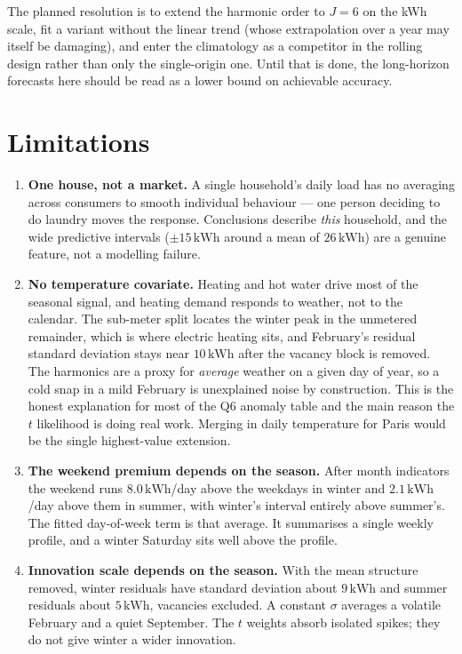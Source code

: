 \documentclass[11pt]{article}
\newcommand{\kwh}{\,\mathrm{kWh}}
\begin{document}
The planned resolution is to extend the harmonic order to $J = 6$ on the kWh
scale, fit a variant without the linear trend (whose extrapolation over a year
may itself be damaging), and enter the climatology as a competitor in the
rolling design rather than only the single-origin one. Until that is done, the
long-horizon forecasts here should be read as a lower bound on achievable
accuracy.

\section{Limitations}
\label{sec:limits}

\begin{enumerate}[leftmargin=*]
\item \textbf{One house, not a market.} A single household's daily load has no
averaging across consumers to smooth individual behaviour --- one person
deciding to do laundry moves the response. Conclusions describe \emph{this}
household, and the wide predictive intervals ($\pm 15\kwh$ around a mean of
$26\kwh$) are a genuine feature, not a modelling failure.

\item \textbf{No temperature covariate.} Heating and hot water drive most of the
seasonal signal, and heating demand responds to weather, not to the calendar.
The sub-meter split locates the winter peak in the unmetered remainder, which
is where electric heating sits, and February's residual standard deviation
stays near $10\kwh$ after the vacancy block is removed. The harmonics are a
proxy for \emph{average} weather on a given day of year, so a cold snap in a
mild February is unexplained noise by construction. This is the honest
explanation for most of the Q6 anomaly table and the main reason the $t$
likelihood is doing real work. Merging in daily temperature for Paris would
be the single highest-value extension.

\item \textbf{The weekend premium depends on the season.} After month
indicators the weekend runs $8.0\kwh$/day above the weekdays in winter and
$2.1\kwh$/day above them in summer, with winter's interval entirely above
summer's. The fitted day-of-week term is that average. It summarises a single
weekly profile, and a winter Saturday sits well above the profile.

\item \textbf{Innovation scale depends on the season.} With the mean structure
removed, winter residuals have standard deviation about $9\kwh$ and summer
residuals about $5\kwh$, vacancies excluded. A constant $\sigma$ averages a
volatile February and a quiet September. The $t$ weights absorb isolated
spikes; they do not give winter a wider innovation.


\end{enumerate}
\end{document}
